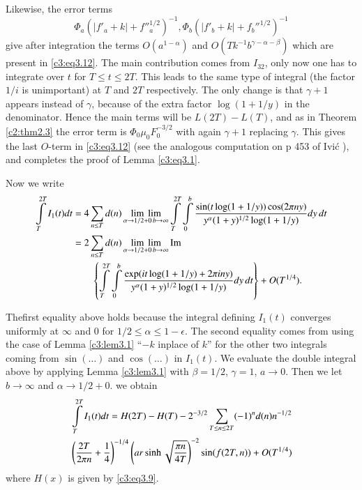 Likewise, the error terms
$$
\Phi_a \left(|f'_a + k| + f{''}_a^{1/2}\right)^{-1}, \Phi_b \left(|f'_b
+ k| + f_b''^{1/2}\right)^{-1}
$$
give after integration the terms $O(a^{1- \alpha})$ and
$O(Tk^{-1}b^{\gamma - \alpha - \beta})$ which are present in
\eqref{c3:eq3.12}. The main contribution comes from $I_{32}$, only now
one has to integrate over $t$ for $T \leq t \leq 2T$. This leads to
the same type of integral (the factor $1/i$ is unimportant) at $T$ and
$2T$ respectively. The only change is that $\gamma+1$ appears instead
of $\gamma$, because of the extra factor $\log (1+ 1/y)$ in the
denominator. Hence the main terms will be $L(2T)- L(T)$, and as in
Theorem \ref{c2:thm2.3} the error term is $\Phi_0 \mu_0 F_0^{-3/2}$
with again $\gamma +1$ replacing $\gamma$. This gives the last
$O$-term in \eqref{c3:eq3.12} (see the analogous computation on p 453
of Ivi\'c \cite{Ivic1}), and completes the proof of Lemma
\eqref{c3:eq3.1}.   

Now we write
{\fontsize{10}{12}\selectfont
\begin{align*}
  \int\limits_T^{2T} I_1 (t) dt & = 4 \sum_{n \leq T} d(n)
  \mathop{\lim~\lim}_{\alpha \to 1/2 + 0\, b \to \infty}
  \int\limits_T^{2T}\int\limits_0^b \frac{\sin (t \log (1+1/y))\cos
    (2 \pi ny)}{y^\alpha (1+y)^{1/2} \log (1+ 1/y)} dy \, dt\\
  & = 2 \sum_{n \leq T} d(n) \mathop{\lim~\lim}_{\alpha \to 1/2 + 0 \,
  b \to \infty} \operatorname{Im} \\
& \qquad \left\{\int\limits_T^{2T} \int\limits_0^b
  \frac{\exp (it \log (1+ 1/y) + 2 \pi i n y)}{y^\alpha (1+ y)^{1/2}
    \log (1+ 1/y)} dy\, dt \right\} + O(T^{1/4}).
\end{align*}}

The\pageoriginale first equality above holds because the integral defining $I_1 (t)$
converges uniformly at $\infty$ and 0 for $1/2 \leq \alpha \leq 1 -
\epsilon$. The second equality comes from using the case of Lemma
\ref{c3:lem3.1} ``$-k$ inplace of $k$'' for the other two integrals
coming from $\sin (\ldots)$ and $\cos (\ldots)$ in $I_1 (t)$. We
evaluate the double integral above by applying Lemma \ref{c3:lem3.1}
with $\beta = 1/2$, $\gamma=1$, $a \to 0$. Then we let $b \to \infty$
and $\alpha \to 1/2 + 0$. we obtain 
\begin{align}
  &\int\limits_T^{2T} I_1 (t) dt  = H(2T) - H(T) - 2^{-3/2} \sum_{T
    \leq n \leq 2T} (-1)^n d(n) n^{-1/2}\notag\\
  & \left(\frac{2T}{2 \pi n} + \frac{1}{4} \right)^{-1/4} \left(ar
  \sinh \sqrt{\frac{\pi n}{4T}}\right)^{-2} \sin (f (2T, n)) + O
  (T^{1/4})\label{c3:eq3.13}
\end{align}
where $H(x)$ is given by \eqref{c3:eq3.9}.

